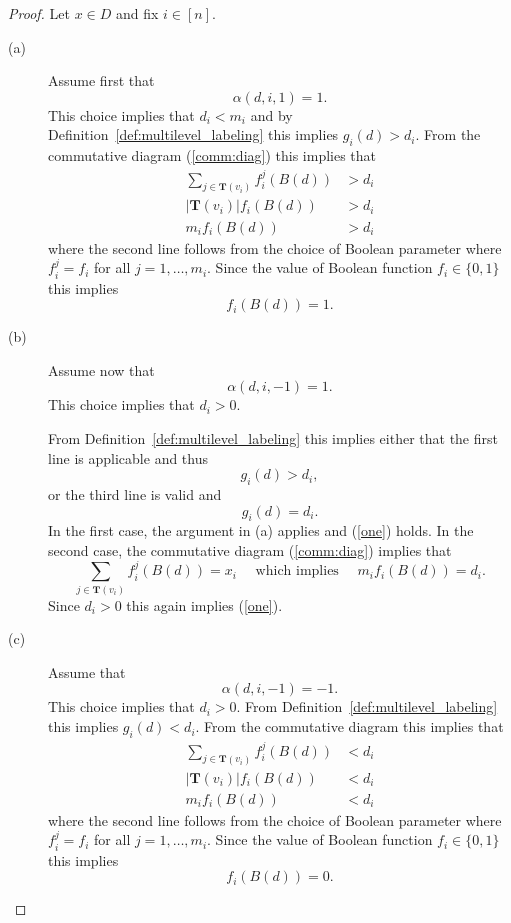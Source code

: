 \documentclass[12pt, notitlepage]{amsart}
\theoremstyle{definition}
\newcommand{\Targets}{\mathbf{T}}
\newcommand{\Tomas}[1]{{\color{red}{{\bf Tomas: }#1}}}
\begin{document}
  \begin{proof}
    Let $x \in D$ and fix $i \in [n]$.%

    \begin{description}
      \item[(a)]  Assume first that
        \[ \alpha(d, i, 1) = 1.\]
        This choice implies that  $d_i < m_i$ and by Definition~\ref{def:multilevel_labeling} this implies
        $g_i(d) >d_i.$
        From the commutative diagram (\ref{comm:diag}) this implies that
        \begin{align*}
          \sum_{j \in \Targets(v_i)} f_i^j(B(d))& >d_i \\
          |\Targets(v_i)|f_i(B(d))& >d_i \\
          m_i f_i(B(d))& >d_i
        \end{align*}
        where the second line follows from the choice of Boolean parameter where $f_i^j = f_i$ for all $j = 1, \ldots, m_i$.
        Since the value of Boolean function $f_i \in \{0,1\}$ this implies
        \begin{equation}\label{one}
          f_i(B(d)) = 1.
        \end{equation}

      \item[(b)] Assume now that
        \[ \alpha(d, i, -1) = 1.\]
        This choice implies that  $d_i >0 $.

        From Definition~\ref{def:multilevel_labeling} this implies
        either that the first line is applicable and thus
        \[ g_i(d) >d_i,\]
        or the third line is valid and
        \[ g_i(d) =d_i.\]
        In the first case, the argument in (a) applies and  (\ref{one}) holds.
        In the second case, the commutative diagram (\ref{comm:diag}) implies that
        \[
          \sum_{j \in \Targets(v_i)} f_i^j(B(d)) =x_i \quad \mbox{ which implies } \quad
        m_i f_i(B(d)) =d_i .\]
        Since $d_i>0$  this again implies  (\ref{one}).

      \item[(c)] Assume  that
        \[ \alpha(d, i, -1) = -1.\]
        This choice implies that  $d_i >0$.
        From Definition~\ref{def:multilevel_labeling} this implies
        $g_i(d) <d_i.$
        From the commutative diagram this implies that
        \begin{align*}
          \sum_{j \in \Targets(v_i)} f_i^j(B(d))& <d_i \\
          |\Targets(v_i)|f_i(B(d))& <d_i \\
          m_i f_i(B(d))& <d_i
        \end{align*}
        where the second line follows from the choice of Boolean parameter where $f_i^j = f_i$ for all $j = 1, \ldots, m_i$.
        Since the value of Boolean function $f_i \in \{0,1\}$ this implies
        \begin{equation}\label{two}
          f_i(B(d)) = 0.
        \end{equation}


\end{description}
\end{proof}
\end{document}
